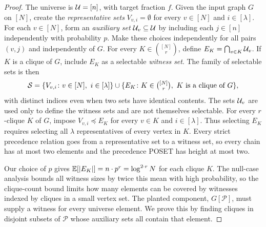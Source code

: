 \begin{proof}
    The universe is $\mathcal{U}=[n]$, with target fraction $f$. Given the input graph $G$ on $[N]$, create the \emph{representative sets} $V_{v,i}=\emptyset$ for every $v\in[N]$ and $i\in[\lambda]$. For each $v\in[N]$, form an \emph{auxiliary set} $\mathcal{U}_v\subseteq\mathcal{U}$ by including each $j\in[n]$ independently with probability $p$. Make these choices independently for all pairs $(v,j)$ and independently of $G$.
    For every $K\in\binom{[N]}{r}$, define $E_K=\bigcap_{v\in K}\mathcal{U}_v$. If $K$ is a clique of $G$, include $E_K$ as a selectable \emph{witness set}. The family of selectable sets is then
    \[
        \cS=\{V_{v,i}\colon v\in[N],\ i\in[\lambda]\}
        \cup\{E_K\colon K\in\tbinom{[N]}{r},\ K\text{ is a clique of }G\},
    \]
    with distinct indices even when two sets have identical contents. The sets $\mathcal{U}_v$ are used only to define the witness sets and are not themselves selectable. For every $r$-clique $K$ of $G$, impose $V_{v,i}\preceq E_K$ for every $v\in K$ and $i\in[\lambda]$. Thus selecting $E_K$ requires selecting all $\lambda$ representatives of every vertex in $K$. Every strict precedence relation goes from a representative set to a witness set, so every chain has at most two elements and the precedence POSET has height at most two.

    Our choice of $p$ gives $\mathbb E[\mathopen{}\left| E_K \right|]=n\cdot p^r=\log^{2\cdot r}N$ for each clique $K$. The null-case analysis bounds all witness sizes by twice this mean with high probability, so the clique-count bound limits how many elements can be covered by witnesses indexed by cliques in a small vertex set. The planted component, $G[\mathcal P]$, must supply a witness for every universe element. We prove this by finding cliques in disjoint subsets of $\mathcal P$ whose auxiliary sets all contain that element.


\end{proof}
